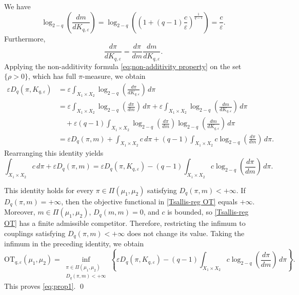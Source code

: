\documentclass[a4paper,11pt]{article}
\theoremstyle{plain}
\theoremstyle{definition}
\theoremstyle{remark}
\theoremstyle{plain}
\newenvironment{pf}[1]
{{\noindent\textbf{Proof of #1.}}}{\hfill \qed}
\numberwithin{equation}{section}
\newcommand{\D}{\mathcal{D}}
\newcommand{\ep}{\varepsilon}
\newcommand{\1}{\mbox{1}\hspace{-0.25em}\mbox{l}} %
\begin{document}
\begin{pf}{Proposition \ref{prop1}}
We have
\begin{equation*}
\log_{2-q}\left(\frac{dm}{dK_{q,\ep}}\right) = \log_{2-q}\left( \left(1+(q-1)\frac{c}{\ep}\right)^{\frac{1}{q-1}} \right) = \frac{c}{\ep}.
\end{equation*}
Furthermore,
\begin{equation*}
\frac{d\pi}{dK_{q,\ep}} = \frac{d\pi}{dm}\frac{dm}{dK_{q,\ep}}.
\end{equation*}
Applying the non-additivity formula \eqref{eq;non-additivity property} on the set $\{\rho>0\}$, which has full $\pi$-measure, we obtain
\begin{align*}
\ep D_q(\pi,K_{q,\ep}) &= \ep\int_{X_1\times X_2} \log_{2-q}\left(\frac{d\pi}{dK_{q,\ep}}\right)\,d\pi \\
&= \ep\int_{X_1\times X_2} \log_{2-q}\left(\frac{d\pi}{dm}\right)\,d\pi + \ep\int_{X_1\times X_2} \log_{2-q}\left(\frac{dm}{dK_{q,\ep}}\right)\,d\pi \\
&\quad + \ep(q-1)\int_{X_1\times X_2} \log_{2-q}\left(\frac{d\pi}{dm}\right) \log_{2-q}\left(\frac{dm}{dK_{q,\ep}}\right)\,d\pi \\
&= \ep D_q(\pi,m) + \int_{X_1\times X_2}c\,d\pi + (q-1)\int_{X_1\times X_2}
c\log_{2-q}\left(\frac{d\pi}{dm}\right)\,d\pi.
\end{align*}
Rearranging this identity yields
\begin{equation*}
\int_{X_1\times X_2}c\,d\pi+\ep D_q(\pi,m)
= \ep D_q(\pi,K_{q,\ep}) - (q-1)\int_{X_1\times X_2} c\log_{2-q}\left(\frac{d\pi}{dm}\right)\,d\pi.
\end{equation*}

This identity holds for every $\pi\in\Pi(\mu_1,\mu_2)$ satisfying $D_q(\pi,m)< +\infty$. If $D_q(\pi,m) = +\infty$, then the objective functional in \eqref{Tsallis-reg OT} equals $+\infty$. Moreover, $m\in\Pi(\mu_1,\mu_2)$, $D_q(m,m)=0$, and $c$ is bounded, so \eqref{Tsallis-reg OT} has a finite admissible competitor. Therefore, restricting the infimum to couplings satisfying $D_q(\pi,m) < +\infty$ does not change its value. Taking the infimum in the preceding identity, we obtain
\begin{equation*}
\mathrm{OT}_{q,\ep}(\mu_1,\mu_2) = \inf_{\substack{\pi\in\Pi(\mu_1,\mu_2)\\D_q(\pi,m)<+\infty}} \left\{ \ep D_q(\pi,K_{q,\ep}) - (q-1)\int_{X_1\times X_2} c\log_{2-q}\left(\frac{d\pi}{dm}\right)\,d\pi \right\}.
\end{equation*}
This proves \eqref{eq;prop1}.
\end{pf}
\end{document}
